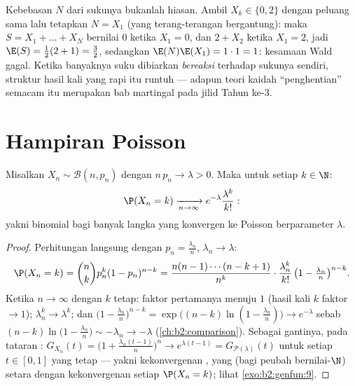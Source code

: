 \begin{remark}
Kebebasan $N$ dari sukunya bukanlah hiasan.
Ambil $X_k \in \{0, 2\}$ dengan peluang sama lalu tetapkan $N =
X_1$ (yang terang-terangan bergantung): maka $S = X_1 + \dots + X_N$ bernilai
$0$ ketika $X_1 = 0$, dan $2 + X_2$ ketika $X_1 = 2$, jadi $\E(S) =
\frac12(2 + 1) = \frac32$, sedangkan $\E(N)\E(X_1) = 1\cdot1 =
1$: kesamaan Wald gagal. Ketika banyaknya suku
dibiarkan \emph{bereaksi} terhadap sukunya sendiri, struktur
hasil kali yang rapi itu runtuh --- adapun teori  kaidah
``penghentian'' semacam itu merupakan bab martingal pada jilid
Tahun ke-3.
\end{remark}

\section{Hampiran Poisson}

\begin{theorem}\label{thm:b2:genfun:rareevents}
Misalkan $X_n \sim \mathcal{B}(n, p_n)$ dengan $n\,p_n \to \lambda > 0$.
Maka untuk setiap $k \in \N$:
\[
\P(X_n = k)
\xrightarrow[n\to\infty]{}
e^{-\lambda}\frac{\lambda^k}{k!} :
\]
yakni  binomial bagi banyak  langka yang  konvergen ke
 Poisson berparameter $\lambda$.
\end{theorem}

\begin{proof}
Perhitungan langsung dengan $p_n = \frac{\lambda_n}{n}$, $\lambda_n
\to \lambda$:
\[
\P(X_n = k)
= \binom nk p_n^k(1 - p_n)^{n-k}
= \frac{n(n-1)\cdots(n-k+1)}{n^k}\cdot
\frac{\lambda_n^k}{k!}\,
\bigl(1 - \tfrac{\lambda_n}{n}\bigr)^{n-k} .
\]
Ketika $n \to \infty$ dengan $k$ tetap: faktor pertamanya menuju $1$
(hasil kali $k$ faktor $\to 1$); $\lambda_n^k \to \lambda^k$;
dan $\bigl(1 - \frac{\lambda_n}{n}\bigr)^{n-k} =
\exp\bigl((n-k)\ln(1 - \frac{\lambda_n}{n})\bigr) \to
e^{-\lambda}$ sebab $(n - k)\ln\bigl(1 - \frac{\lambda_n}{n}\bigr)
\sim -\lambda_n \to -\lambda$
(\cref{ch:b2:comparison}). Sebagai gantinya, pada tataran
: $G_{X_n}(t) = \bigl(1 +
\frac{\lambda_n(t-1)}{n}\bigr)^n \to e^{\lambda(t - 1)} =
G_{\mathcal{P}(\lambda)}(t)$ untuk setiap $t \in [0, 1]$ yang tetap ---
yakni kekonvergenan , yang (bagi peubah
bernilai-$\N$) setara dengan kekonvergenan setiap $\P(X_n = k)$;
lihat \cref{exo:b2:genfun:9}.
\end{proof}

